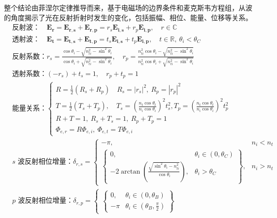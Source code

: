 \documentclass[UTF8]{report}
\def\R{\mathbb{R}}
\def\C{\mathbb{C}}
\theoremstyle{MyLineTheoremStyle} %
\theoremstyle{MyBlockTheoremStyle} %
\theoremstyle{MySubsubsectionStyle} %
\begin{document}
整个结论由菲涅尔定律推导而来，基于电磁场的边界条件和麦克斯韦方程组，从波的角度揭示了光在反射折射时发生的变化，包括振幅、相位、能量、位移等关系。
\begin{align}
&\text{反射波：} \quad \boldsymbol{E_r} = \boldsymbol{E_{r,s}} + \boldsymbol{E_{r,p}} = r_s \boldsymbol{E_{i,s}} + r_p \boldsymbol{E_{i,p}},\quad  r \in \C 
\\ 
&\text{透射波：}\quad \boldsymbol{E_t} = \boldsymbol{E_{t,s}} + \boldsymbol{E_{t,p}} = t_s \boldsymbol{E_{i,s}} + t_p \boldsymbol{E_{i,p}},\quad  t \in \R,\ \theta_i < \theta_C
\\ 
& \text{反射系数：}
    r_s = \frac{\cos \theta_i - \sqrt{n_{ti}^2 - \sin^2 \theta_i} }{\cos \theta_i + \sqrt{n_{ti}^2 - \sin^2 \theta_i}},\quad  r_p = \frac{n_{ti}^2\cos \theta_i - \sqrt{n_{ti}^2 - \sin^2 \theta_i} }{n_{ti}^2\cos \theta_i + \sqrt{n_{ti}^2 - \sin^2 \theta_i}}
\\ 
& \text{透射系数：}(-r_s) + t_s  = 1,\quad r_p + t_p = 1 
\\
& \text{能量关系：}
\begin{cases}
    R = \frac{1}{2}(R_s + R_p)\quad R_s = | r_s |^2,\ R_p = | r_p |^2 \\ 
    T = \frac{1}{2}(T_s + T_p),\quad 
    T_s = \left( \frac{n_t \cos \theta_t}{n_i \cos \theta_i} \right)^2 t_s^2, T_p = \left( \frac{n_t \cos \theta_t}{n_i \cos \theta_i} \right)^2 t_p^2 \\
    R + T = 1 ,\ R_s + T_s = 1,\ R_p + T_p = 1 \\ 
    \Phi_{e,r} = R\Phi_{e,i},\ \Phi_{e,t} = T\Phi_{e,i}
\end{cases}
\\
& \text{$s$ 波反射相位增量：} 
\delta_{r,s} = 
\left\{\begin{matrix}
    -\pi, & n_i < n_t \\ 
    \begin{Bmatrix}
        0, & \theta_i \in (0, \theta_C)\\
        - 2 \arctan \left( \frac{\sqrt{\sin^2 \theta_i - n_{ti}^2} }{\cos \theta_i} \right), & \theta_i > \theta_C
    \end{Bmatrix}, & n_i > n_t
\end{matrix}\right.
\\
& \text{$p$ 波反射相位增量：} 
\delta_{r,p} = 
\left\{\begin{matrix}
    \begin{Bmatrix}
        0, & \theta_i \in (0, \theta_B) \\
        - \pi & \theta_i \in (\theta_B, \frac{\pi}{2})

\end{Bmatrix}
\end{matrix}
\end{align}
\end{document}
